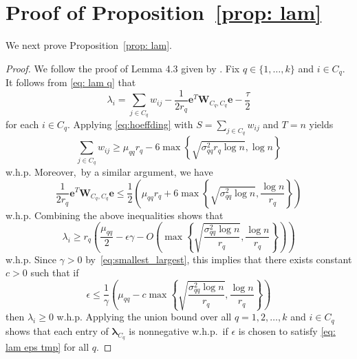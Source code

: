 \documentclass[twoside,11pt]{article}
\newcommand{\bs}{\boldsymbol}
\newcommand{\0}{\bs{0}}
\newcommand{\rbra}[1]{\ensuremath{\left( #1 \right)}} %
\newcommand{\bra}[1]{\ensuremath{\left\{ #1 \right\}}} %
\begin{document}
\section{Proof of Proposition~\ref{prop: lam}}
\label{app: lam}
We next prove Proposition~\ref{prop: lam}.
\begin{proof}
We follow the proof of Lemma 4.3 given by \cite{ames2014guaranteed}. Fix $q \in \{1,\dots,k\}$ and $i \in C_q$.
It follows from \eqref{eq: lam q} that
\[
\lambda_i = \sum_{j \in C_q} w_{ij} - \frac{1}{2r_q}\bs{e}^T\bs{W}_{C_q,C_q}\bs{e}-\frac{\tau}{2}
\]
for each \(i \in C_q\).
Applying \eqref{eq:hoeffding} with ${S} = \sum_{j \in C_q} w_{ij}$ and $T = n$ yields
\[
	\sum_{j \in C_q} w_{ij} \geq \mu_{qq} r_q
		- 6 \max \bra{ \sqrt{ \sigma_{qq}^2 r_q \log n }, \log n}
\]
w.h.p. Moreover,~by a similar argument, we have
\[
	\frac{1}{2r_q}\bs{e}^T\bs{W}_{C_q,C_q}\bs{e}
	\leq \frac{1}{2}\left(\mu_{qq} r_q +
	6 \max\bra{ \sqrt{\sigma_{qq}^2 \log n}, \frac{\log n}{r_q} }\right)
\]
w.h.p.
Combining the above inequalities shows that
\[
	\lambda_i \geq	r_q \rbra{ \frac{\mu_{qq}}{2} - \epsilon \gamma
		- O \rbra{ \max \bra{ \sqrt{  \frac{\sigma_{qq}^2 \log n }{r_q} },
			\frac{\log n }{r_q} } } }
\]
w.h.p.
Since $\gamma > 0$ by~\eqref{eq:smallest_largest}, this implies that
there exists constant $c>0$ such that if
\begin{equation} \label{eq: lam eps tmp}
	\epsilon \leq \frac{1}{\gamma}
	\rbra{ \mu_{qq}  - c \max \bra{ \sqrt{  \frac{\sigma_{qq}^2 \log 		n }{r_q} },
			\frac{\log n }{r_q} } }
\end{equation}
then
$\lambda_i \geq 0$ w.h.p.
Applying the union bound over all \(q =1,2,\dots, k\) and
\(i\in C_q\) shows that each entry of $\bs{\lambda}_{C_q}$ is nonnegative w.h.p.~if \(\epsilon\) is chosen to satisfy \eqref{eq: lam eps tmp} for all $q$.
\end{proof}
\end{document}
